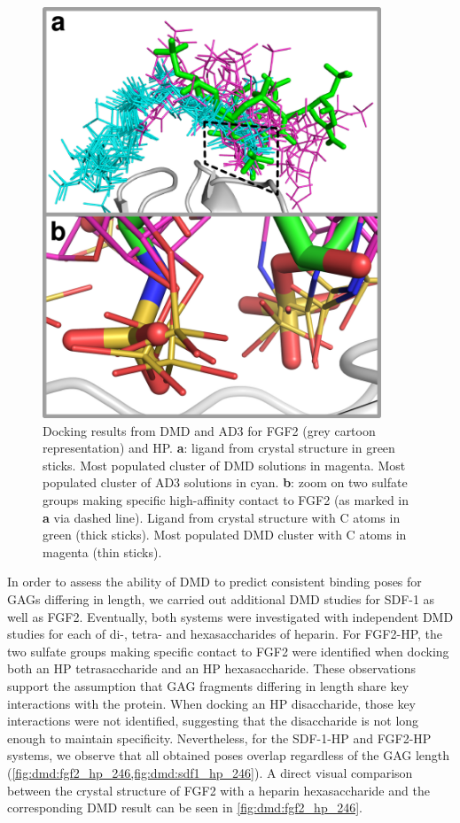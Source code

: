 \begin{figure}
\centering
\includegraphics[width=0.9\textwidth]{gfx/dmd/fgf2_topclusters_dmd_vs_ad3_receptorribbon_normal_and_zoom_jcc_004.png}
\caption[]{
Docking results from DMD and AD3 for FGF2 (grey cartoon representation) and HP.
\textbf{a}: ligand from crystal structure in green sticks. Most populated
cluster of DMD solutions in magenta. Most populated cluster of AD3 solutions in
cyan. \textbf{b}: zoom on two sulfate groups making specific high-affinity
contact to FGF2 \cite{faham_heparin_1996} (as marked in \textbf{a} via dashed
line). Ligand from crystal structure with C atoms in green (thick sticks). Most
populated DMD cluster with C atoms in magenta (thin sticks).
}
\label{fig:dmd:fgf2zoom}
\end{figure}


In order to assess the ability of DMD to predict consistent binding poses for
GAGs differing in length, we carried out additional DMD studies for SDF-1 as
well as FGF2. Eventually, both systems were investigated with independent DMD
studies for each of di-, tetra- and hexasaccharides of heparin. For FGF2-HP, the
two sulfate groups making specific contact to FGF2 were identified when docking
both an HP tetrasaccharide and an HP hexasaccharide. These observations support
the assumption that GAG fragments differing in length share key interactions
with the protein. When docking an HP disaccharide, those key interactions were
not identified, suggesting that the disaccharide is not long enough to maintain
specificity. Nevertheless, for the SDF-1-HP and FGF2-HP systems, we observe that
all obtained poses overlap regardless of the GAG length
(\cref{fig:dmd:fgf2_hp_246,fig:dmd:sdf1_hp_246}).  A direct visual comparison
between the crystal structure of FGF2 with a heparin
hexasaccharide \cite{faham_heparin_1996} and the corresponding DMD result can
be seen in \cref{fig:dmd:fgf2_hp_246}.


